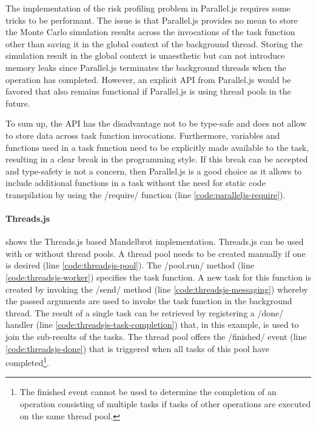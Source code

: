 The implementation of the risk profiling problem in Parallel.js requires some tricks to be performant. The issue is that Parallel.js provides no mean to store the Monte Carlo simulation results across the invocations of the task function other than saving it in the global context of the background thread. Storing the simulation result in the global context is unaesthetic but can not introduce memory leaks since Parallel.js terminates the background threads when the operation has completed. However, an explicit API from Parallel.js would be favored that also remains functional if Parallel.js is using thread pools in the future.

To sum up, the API has the disadvantage not to be type-safe and does not allow to store data across task function invocations. Furthermore, variables and functions used in a task function need to be explicitly made available to the task, resulting in a clear break in the programming style. If this break can be accepted and type-safety is not a concern, then Parallel.js is a good choice as it allows to include additional functions in a task without the need for static code transpilation by using the \javascriptinline/require/ function (line \ref{code:paralleljs-require}).

\paragraph{Threads.js}
 shows the Threads.js based Mandelbrot implementation. Threads.js can be used with or without thread pools. A thread pool needs to be created manually if one is desired (line \ref{code:threadsjs-pool}). The \javascriptinline/pool.run/ method (line \ref{code:threadsjs-worker}) specifies the task function. A new task for this function is created by invoking the \javascriptinline/send/ method (line \ref{code:threadsjs-messaging}) whereby the passed arguments are used to invoke the task function in the background thread. The result of a single task can be retrieved by registering a \javascriptinline/done/ handler (line \ref{code:threadsjs-task-completion}) that, in this example, is used to join the sub-results of the tasks. The thread pool offers the \javascriptinline/finished/ event (line \ref{code:threadsjs-done}) that is triggered when all tasks of this pool have completed\footnote{The finished event cannot be used to determine the completion of an operation consisting of multiple tasks if tasks of other operations are executed on the same thread pool.}.

